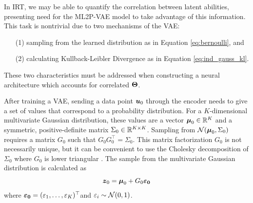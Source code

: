 In IRT, we may be able to quantify the correlation between latent abilities, presenting need for the ML2P-VAE model to take advantage of this information. This task is nontrivial due to two mechanisms of the VAE:
\begin{itemize}
  \item[(1)] sampling from the learned distribution as in Equation \ref{eq:bernoulli}, and
  \item[(2)] calculating Kullback-Leibler Divergence as in Equation \ref{eq:ind_gauss_kl}.
\end{itemize}
These two characteristics must be addressed when constructing a neural architecture which accounts for correlated $\boldsymbol{\Theta}$.

After training a VAE, sending a data point $\boldsymbol{u}_0$ through the encoder needs to give a set of values that correspond to a probability distribution. For a $K$-dimensional multivariate Gaussian distribution, these values are a vector $\boldsymbol{\mu}_0 \in \mathbb{R}^K$ and a symmetric, positive-definite matrix $\Sigma_0 \in \mathbb{R}^{K\times K}$. Sampling from $\mathcal{N}(\boldsymbol{\mu}_0, \Sigma_0)$ requires a matrix $G_0$ such that $G_0 G_0^\top = \Sigma_0$. This matrix factorization $G_0$ is not necessarily unique, but it can be convenient to use the Cholesky decomposition of $\Sigma_0$ where $G_0$ is lower triangular \cite{atkinson}. The sample from the multivariate Gaussian distribution is calculated as
\begin{equation}
  \boldsymbol{z}_0 = \boldsymbol{\mu}_0 + G_0 \boldsymbol{\varepsilon_0}
  \label{eq:multivariate_sample}
\end{equation}
where $\boldsymbol{\varepsilon_0} = (\varepsilon_1, \ldots, \varepsilon_K)^\top $and $\varepsilon_i \sim \mathcal{N}(0,1)$. 

